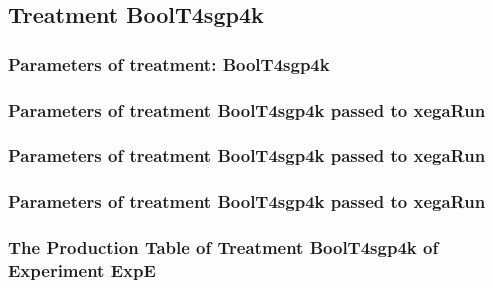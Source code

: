 \documentclass[18pt,c]{beamer}
\makeatletter
\def\beamer@writeslidentry@miniframesoff{%
  \expandafter\beamer@ifempty\expandafter{\beamer@framestartpage}{}%
  {%
   \clearpage\beamer@notesactions%
  }
}
\newcommand*{\miniframesoff}{\let\beamer@writeslidentry=\beamer@writeslidentry@miniframesoff}
\makeatother
\begin{document}
\miniframesoff
\subsection{Treatment BoolT4sgp4k}

 \begin{frame}
 \fontsize{8pt}{9pt}\selectfont
 \frametitle{  Parameters of treatment: BoolT4sgp4k 
 }

 \label{ExpEtParmTable008.tex}  
 \end{frame}


 \begin{frame}
 \fontsize{8pt}{9pt}\selectfont
 \frametitle{  Parameters of treatment BoolT4sgp4k passed to xegaRun
 }

 \label{ExpEtParmTable009.tex}  
 \end{frame}


 \begin{frame}
 \fontsize{8pt}{9pt}\selectfont
 \frametitle{  Parameters of treatment BoolT4sgp4k passed to xegaRun
 }

 \label{ExpEtParmTable010.tex}  
 \end{frame}


 \begin{frame}
 \fontsize{8pt}{9pt}\selectfont
 \frametitle{  Parameters of treatment BoolT4sgp4k passed to xegaRun
 }

 \label{ExpEtParmTable011.tex}  
 \end{frame}

 \begin{frame}
 \fontsize{8pt}{9pt}\selectfont
 \frametitle{ The Production Table of Treatment BoolT4sgp4k of Experiment ExpE }

 \label{ExpEGrammarTable002.tex}  
 \end{frame}
\end{document}
